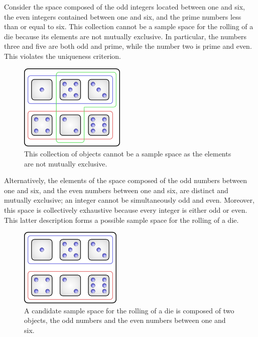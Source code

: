 \begin{example}
Consider the space composed of the odd integers located between one and six, the even integers contained between one and six, and the prime numbers less than or equal to six.
This collection cannot be a sample space for the rolling of a die because its elements are not mutually exclusive.
In particular, the numbers three and five are both odd and prime, while the number two is prime and even.
This violates the uniqueness criterion.

\begin{figure}[htb!]
\begin{center}
\includegraphics[height=4.125cm]{Figures/2Chapter/nonadmissiblespace}
\caption{This collection of objects cannot be a sample space as the elements are not mutually exclusive.}
\end{center}
\end{figure}

Alternatively, the elements of the space composed of the odd numbers between one and six, and the even numbers between one and six, are distinct and mutually exclusive;
an integer cannot be simultaneously odd and even.
Moreover, this space is collectively exhaustive because every integer is either odd or even.
This latter description forms a possible sample space for the rolling of a die.

\begin{figure}[htb!]
\begin{center}
\includegraphics[height=3.75cm]{Figures/2Chapter/admissiblespace}
\end{center}
\caption{A candidate sample space for the rolling of a die is composed of two objects, the odd numbers and the even numbers between one and six.}
\end{figure}
\end{example}


